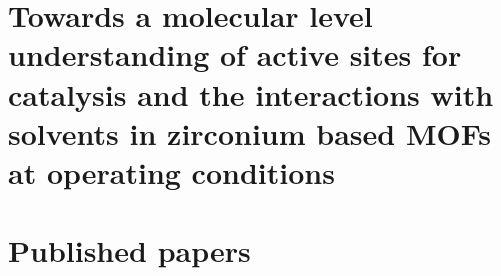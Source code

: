 \documentclass[10pt,twoside]{book}
\newcommand\oddpageleftmark{}
\newcommand\evenpagerightmark{}
\begin{document}
\renewcommand*{\thesection}{\thechapter.\arabic{section}}       %

\graphicspath{{figures/}}


\mainmatter     %
\renewcommand*{\thesection}{\thechapter.\arabic{section}}

\newcommand\fdtsvrightmarktmp{{\scshape\small Chapter }}
\renewcommand\evenpagerightmark{{\scshape\small\chaptername\ \thechapter}}
\renewcommand\oddpageleftmark{{\scshape\small\leftmark}}



\baselineskip 13.0pt

\part{Towards a molecular level understanding of active sites for catalysis and the interactions with solvents in zirconium based MOFs at operating conditions}
\graphicspath{{figures/}}





\part{Published papers}



\appendix


%
%


% 
\clearpage{\pagestyle{empty}\cleardoublepage}




\cleardoublepage

\end{document}
